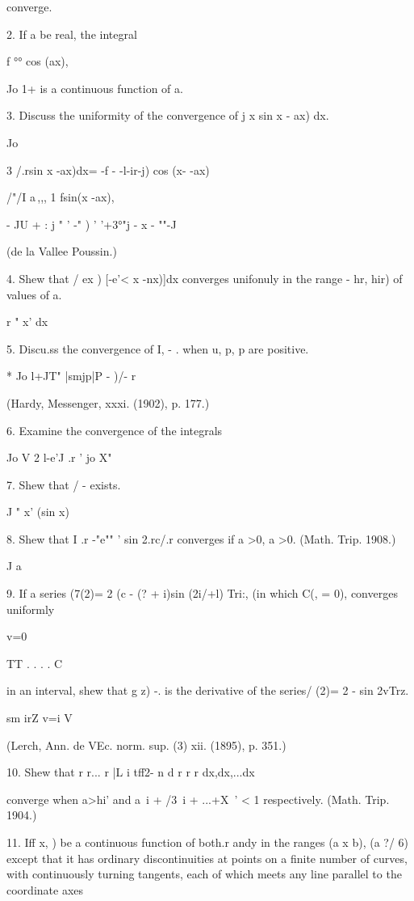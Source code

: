 converge. 

2. If a be real, the integral

f °° cos (ax),

Jo 1+ is a continuous function of a. 

3. Discuss the uniformity of the convergence of j x sin x - ax) dx.

Jo

3 /.rsin x -ax)dx= -f - -l-ir-j) cos (x- -ax)

/"/I a\,,,, 1 fsin(x -ax), ~\

- JU + : j " ' -" ) ' '+3°"j - x - ""-J

(de la Vallee Poussin.)

4. Shew that / ex ) [-e'< x -nx)]dx converges unifonuly in the range -
hr, hir) of values of a. 

r " x' dx

5. Discu.ss the convergence of I, - . when u, p, p are positive.

* Jo l+JT" |smjp|P - )/- r

(Hardy, Messenger, xxxi. (1902), p. 177.)

6. Examine the convergence of the integrals

Jo V 2 l-e'J .r ' jo X"


7. Shew that / - exists.

J " x' (sin x)

8. Shew that I .r -"e"" ' sin 2.rc/.r converges if a >0, a >0. (Math.
Trip. 1908.)

J a

9. If a series (7(2)= 2 (c - (? + i)sin (2i/+l) Tri:, (in which C(, =
0), converges uniformly

v=0

TT . . . . C

in an interval, shew that g z) -. is the derivative of the series/
(2)= 2 - sin 2vTrz.

sm irZ v=i V

(Lerch, Ann. de VEc. norm. sup. (3) xii. (1895), p. 351.)

10. Shew that r r... r |L i tff2- n d r r r dx,dx,...dx

converge when a>hi' and a~i + /3~i + ...+X~' < 1 respectively. (Math.
Trip. 1904.)

11. Iff x, ) be a continuous function of both.r andy in the ranges (a
x b), (a ?/ 6) except that it has ordinary discontinuities at points
on a finite number of curves, with continuously turning tangents, each
of which meets any line parallel to the coordinate axes

